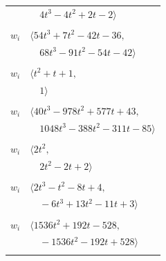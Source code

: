 \documentclass[11pt]{article}
\begin{document}
\begin{longtable}{@{}ll@{}}
 & $\quad 4t^{3}-4t^{2}+2t-2\rangle$\\
\addlinespace[2pt]
\multicolumn{2}{@{}p{0.97\textwidth}@{}}{$i=37$, $D_i=2$, $\rho_{ij}$: $0{:}1, \allowbreak 2{:}3, \allowbreak 3{:}3, \allowbreak 8{:}3, \allowbreak 20{:}2, \allowbreak 28{:}2, \allowbreak 30{:}3, \allowbreak 31{:}3, \allowbreak 34{:}2, \allowbreak 38{:}2$}\\
$w_i$ & $\langle 54t^{3}+7t^{2}-42t-36,$\\
 & $\quad 68t^{3}-91t^{2}-54t-42\rangle$\\
\addlinespace[2pt]
\multicolumn{2}{@{}p{0.97\textwidth}@{}}{$i=38$, $D_i=1$, $\rho_{ij}$: $8{:}2, \allowbreak 37{:}2, \allowbreak 39{:}2$}\\
$w_i$ & $\langle t^{2}+t+1,$\\
 & $\quad 1\rangle$\\
\addlinespace[2pt]
\multicolumn{2}{@{}p{0.97\textwidth}@{}}{$i=39$, $D_i=2$, $\rho_{ij}$: $1{:}3, \allowbreak 5{:}3, \allowbreak 9{:}1, \allowbreak 10{:}2, \allowbreak 17{:}3, \allowbreak 18{:}2, \allowbreak 20{:}1, \allowbreak 24{:}1, \allowbreak 25{:}1, \allowbreak 29{:}3, \allowbreak 34{:}2, \allowbreak 38{:}2$}\\
$w_i$ & $\langle 40t^{3}-978t^{2}+577t+43,$\\
 & $\quad 1048t^{3}-388t^{2}-311t-85\rangle$\\
\addlinespace[2pt]
\multicolumn{2}{@{}p{0.97\textwidth}@{}}{$i=40$, $D_i=1$, $\rho_{ij}$: $14{:}3, \allowbreak 18{:}3, \allowbreak 20{:}3, \allowbreak 24{:}1, \allowbreak 30{:}1$}\\
$w_i$ & $\langle 2t^{2},$\\
 & $\quad 2t^{2}-2t+2\rangle$\\
\addlinespace[2pt]
\multicolumn{2}{@{}p{0.97\textwidth}@{}}{$i=41$, $D_i=1$, $\rho_{ij}$: $5{:}3, \allowbreak 13{:}1, \allowbreak 20{:}1, \allowbreak 22{:}1, \allowbreak 28{:}1, \allowbreak 30{:}2, \allowbreak 32{:}3$}\\
$w_i$ & $\langle 2t^{3}-t^{2}-8t+4,$\\
 & $\quad -6t^{3}+13t^{2}-11t+3\rangle$\\
\addlinespace[2pt]
\multicolumn{2}{@{}p{0.97\textwidth}@{}}{$i=42$, $D_i=32$, $e_i=2$, $\rho_{ij}$: $0{:}2, \allowbreak 3{:}3, \allowbreak 11{:}1, \allowbreak 12{:}1, \allowbreak 14{:}1, \allowbreak 15{:}2, \allowbreak 16{:}2, \allowbreak 17{:}1$}\\
$w_i$ & $\langle 1536t^{2}+192t-528,$\\
 & $\quad -1536t^{2}-192t+528\rangle$\\
\addlinespace[2pt]
\end{longtable}
\endgroup
\end{document}
